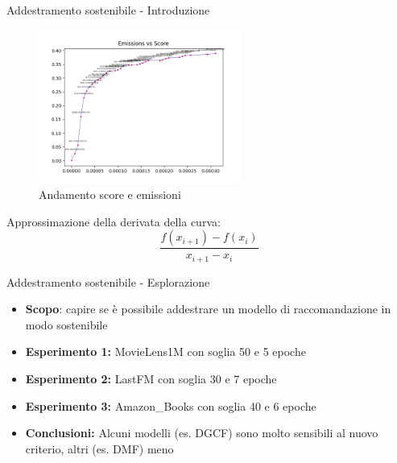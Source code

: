 \begin{frame}{Addestramento sostenibile - Introduzione}
    \begin{figure}
        \centering
        \includegraphics[width=0.6\textwidth]{images/curve_emissions_score.png}
        \caption{Andamento score e emissioni}
    \end{figure} 
Approssimazione della derivata della curva:
\begin{equation*}
    \frac{f(x_{i+1}) - f(x_i)}{x_{i+1} - x_i}
\end{equation*}
\end{frame}

\begin{frame}{Addestramento sostenibile - Esplorazione}
    \begin{itemize}
        \item \textbf{Scopo}: capire se è possibile addestrare un modello di raccomandazione in modo sostenibile
        \item \textbf{Esperimento 1:} MovieLens1M con soglia 50 e 5 epoche
        \item \textbf{Esperimento 2:} LastFM con soglia 30 e 7 epoche
        \item \textbf{Esperimento 3:} Amazon\_Books con soglia 40 e 6 epoche
        \item \textbf{Conclusioni:} Alcuni modelli (es. DGCF) sono molto sensibili al nuovo criterio, altri (es. DMF) meno
    \end{itemize}
\end{frame}

